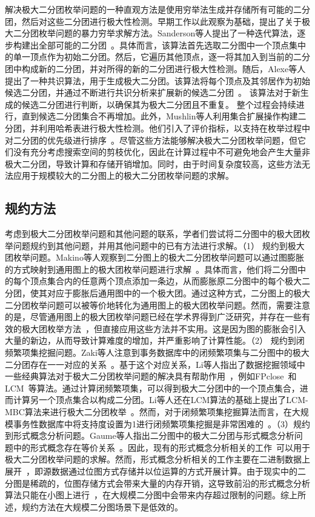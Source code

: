 解决极大二分团枚举问题的一种直观方法是使用穷举法生成并存储所有可能的二分团，然后对这些二分团进行极大性检测。早期工作以此观察为基础，提出了关于极大二分团枚举问题的暴力穷举求解方法。Sanderson等人提出了一种迭代算法，逐步构建出全部可能的二分团~\cite{exhaust03}。具体而言，该算法首先选取二分图中一个顶点集中的单一顶点作为初始二分团。然后，它遍历其他顶点，逐一将其加入到当前的二分团中构成新的二分团，并对所得的新的二分团进行极大性检测。随后，Alexe等人提出了一种共识算法，用于生成极大二分团。该算法将每个顶点及其邻居作为初始候选二分团，并通过不断进行共识分析来扩展新的候选二分团~\cite{MICA04}。
该算法对于新生成的候选二分团进行判断，以确保其为极大二分团且不重复。
整个过程会持续进行，直到候选二分团集合不再增加。此外，Mushlin等人利用集合扩展操作构建二分团，并利用哈希表进行极大性检测。他们引入了评价指标，以支持在枚举过程中对二分团的优先级进行排序~\cite{exhaust07}。尽管这些方法能够解决极大二分团枚举问题，但它们没有充分考虑搜索空间的剪枝优化，因此在计算过程中不可避免地会产生大量非极大二分团，导致计算和存储开销增加。同时，由于时间复杂度较高，这些方法无法应用于规模较大的二分图上的极大二分团枚举问题的求解。

\subsection{规约方法}

考虑到极大二分团枚举问题和其他问题的联系，学者们尝试将二分图中的极大团枚举问题规约到其他问题，并用其他问题中的已有方法进行求解。（1） 规约到极大团枚举问题。Makino等人观察到二分图上的极大二分团枚举问题可以通过图膨胀的方式映射到通用图上的极大团枚举问题进行求解~\cite{Makino04}。具体而言，他们将二分图中的每个顶点集合内的任意两个顶点添加一条边，从而膨胀原二分图中的每个极大二分团，使其对应于膨胀后通用图中的一个极大团。通过这种方式，二分图上的极大二分团枚举问题可以被等价地转化为通用图上的极大团枚举问题。然而，需要注意的是，尽管通用图上的极大团枚举问题已经在学术界得到广泛研究，并存在一些有效的极大团枚举方法~\cite{MCEparallel20,MCE20,MCE22,MCE-GPU21,MCE-22}，但直接应用这些方法并不实用。这是因为图的膨胀会引入大量的新边，从而导致计算难度的增加，并严重影响了计算性能。（2） 规约到闭频繁项集挖掘问题。Zaki等人注意到事务数据库中的闭频繁项集与二分图中的极大二分团存在一一对应的关系~\cite{FCIM98}。基于这个对应关系，Li等人指出了数据挖掘领域中一些经典算法对于极大二分团枚举问题的解决具有帮助作用~\cite{correspondence05}，例如FPclose~\cite{fpclose04}和LCM~\cite{lcm04}等算法。通过计算闭频繁项集，可以得到极大二分团中的一个顶点集合，进而计算另一个顶点集合以构成二分团。Li等人还在LCM算法的基础上提出了LCM-MBC算法来进行极大二分团枚举~\cite{lcmmbc07}。然而，对于闭频繁项集挖掘算法而言，在大规模事务性数据库中将支持度设置为1进行闭频繁项集挖掘是非常困难的~\cite{iMBEA14}。（3）规约到形式概念分析问题。Gaume等人指出二分图中的极大二分团与形式概念分析问题中的形式概念存在等价关系~\cite{fcambe10}。因此，现有的形式概念分析相关的工作~\cite{FCA15,FCA21,FCA22}可以用于极大二分团枚举问题的求解。然而，形式概念分析相关的工作主要在二进制数据上展开~\cite{FCA15}，即源数据通过位图方式存储并以位运算的方式开展计算。由于现实中的二分图是稀疏的，位图存储方式会带来大量的内存开销，这导致前沿的形式概念分析算法只能在小图上进行~\cite{FCA21,FCA22}，在大规模二分图中会带来内存超过限制的问题。综上所述，规约方法在大规模二分图场景下是低效的。

